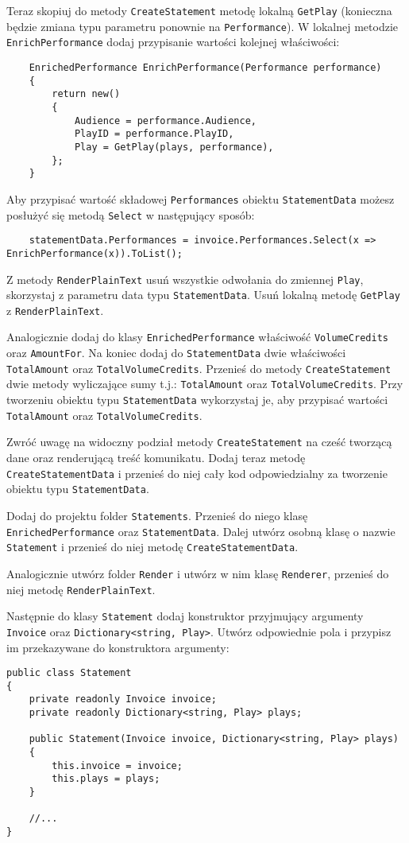 Teraz skopiuj do metody \texttt{CreateStatement} metodę lokalną \texttt{GetPlay} (konieczna będzie zmiana typu parametru ponownie na \texttt{Performance}). W lokalnej metodzie \texttt{EnrichPerformance} dodaj przypisanie wartości kolejnej właściwości:
\begin{lstlisting}
	EnrichedPerformance EnrichPerformance(Performance performance)
	{	
		return new()
		{
			Audience = performance.Audience,
			PlayID = performance.PlayID,
			Play = GetPlay(plays, performance),
		};
	}
\end{lstlisting}
Aby przypisać wartość składowej \texttt{Performances} obiektu \texttt{StatementData} możesz posłużyć się metodą \texttt{Select} w następujący sposób:
\begin{lstlisting}
	statementData.Performances = invoice.Performances.Select(x => EnrichPerformance(x)).ToList();
\end{lstlisting}

Z metody \texttt{RenderPlainText} usuń wszystkie odwołania do zmiennej \texttt{Play}, skorzystaj z parametru data typu \texttt{StatementData}. Usuń lokalną metodę \texttt{GetPlay} z \texttt{RenderPlainText}.

Analogicznie dodaj do klasy \texttt{EnrichedPerformance} właściwość \texttt{VolumeCredits} oraz \texttt{AmountFor}. Na koniec dodaj do \texttt{StatementData} dwie właściwości \texttt{TotalAmount} oraz \texttt{TotalVolumeCredits}. Przenieś do metody \texttt{CreateStatement} dwie metody wyliczające sumy t.j.: \texttt{TotalAmount} oraz \texttt{TotalVolumeCredits}. Przy tworzeniu obiektu typu \texttt{StatementData} wykorzystaj je, aby przypisać wartości \texttt{TotalAmount} oraz \texttt{TotalVolumeCredits}.

Zwróć uwagę na widoczny podział metody \texttt{CreateStatement} na cześć tworzącą dane oraz renderującą treść komunikatu. Dodaj teraz metodę \texttt{CreateStatementData} i przenieś do niej cały kod odpowiedzialny za tworzenie obiektu typu \texttt{StatementData}.


Dodaj do projektu folder \texttt{Statements}. Przenieś do niego klasę \texttt{EnrichedPerformance} oraz \texttt{StatementData}. Dalej utwórz osobną klasę o nazwie \texttt{Statement} i przenieś do niej metodę \texttt{CreateStatementData}.

Analogicznie utwórz folder \texttt{Render} i utwórz w nim klasę \texttt{Renderer}, przenieś do niej metodę \texttt{RenderPlainText}. 

Następnie do klasy \texttt{Statement} dodaj konstruktor przyjmujący argumenty \texttt{Invoice} oraz \texttt{Dictionary<string, Play>}. Utwórz odpowiednie pola i przypisz im przekazywane do konstruktora argumenty:
\begin{lstlisting}
public class Statement
{
	private readonly Invoice invoice;
	private readonly Dictionary<string, Play> plays;
	
	public Statement(Invoice invoice, Dictionary<string, Play> plays)
	{
		this.invoice = invoice;
		this.plays = plays;
	}

	//...
}
\end{lstlisting}

